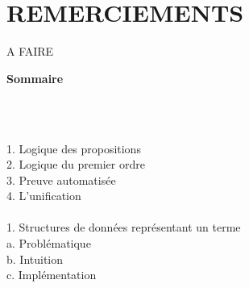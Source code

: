 \documentclass[11pt]{article}
\begin{document}
\newpage
\section*{REMERCIEMENTS}
A FAIRE
\vspace*{\fill}

\newpage %
\begin{titlepage}
    \vspace*{\fill} %

    \begin{center}
        {\Large\bfseries\color{sectioncolor} Sommaire} \\
        \vspace{0.8cm}

        \begin{minipage}{0.8\textwidth}
             \dotfill \pageref{introduction} \\ 
            \vspace{0.5cm}

             \dotfill \pageref{generalites} \\[1em]
            \hspace*{2.8em}1. Logique des propositions \dotfill \pageref{lp} \\[0.5em]
            \hspace*{2.8em}2. Logique du premier ordre \dotfill \pageref{lpo} \\[0.5em]
            \hspace*{2.8em}3. Preuve automatisée \dotfill \pageref{preuve} \\[0.5em]
            \hspace*{2.8em}4. L'unification \dotfill \pageref{unification}\\[1em]

             \dotfill \pageref{structures} \\[1em]
            \hspace*{2.8em}1. Structures de données représentant un terme \dotfill \pageref{repr_terme} \\[0.5em]
            \hspace*{4.5em}a. Problématique \dotfill \pageref{prob} \\[0.3em]
            \hspace*{4.5em}b. Intuition \dotfill \pageref{intuition} \\[0.5em]
            \hspace*{4.5em}c. Implémentation \dotfill \pageref{implem} \\[0.5em]
            

\end{minipage}
\end{center}
\end{titlepage}
\end{document}
